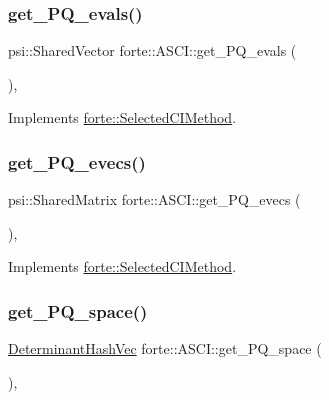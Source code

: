 \subsubsection{\texorpdfstring{get\+\_\+\+P\+Q\+\_\+evals()}{get\_PQ\_evals()}}
{\footnotesize\ttfamily psi\+::\+Shared\+Vector forte\+::\+A\+S\+C\+I\+::get\+\_\+\+P\+Q\+\_\+evals (\begin{DoxyParamCaption}{ }\end{DoxyParamCaption})\hspace{0.3cm}{\ttfamily [override]}, {\ttfamily [virtual]}}



Implements \mbox{\hyperlink{classforte_1_1_selected_c_i_method_a675d28ae66341b8cfabb2953c936621c}{forte\+::\+Selected\+C\+I\+Method}}.

\mbox{\label{classforte_1_1_a_s_c_i_a7b0cff30856eb70d451216e5039e15ee}} 
\subsubsection{\texorpdfstring{get\+\_\+\+P\+Q\+\_\+evecs()}{get\_PQ\_evecs()}}
{\footnotesize\ttfamily psi\+::\+Shared\+Matrix forte\+::\+A\+S\+C\+I\+::get\+\_\+\+P\+Q\+\_\+evecs (\begin{DoxyParamCaption}{ }\end{DoxyParamCaption})\hspace{0.3cm}{\ttfamily [override]}, {\ttfamily [virtual]}}



Implements \mbox{\hyperlink{classforte_1_1_selected_c_i_method_a5e5212836aa0dc35f98238d1f426abed}{forte\+::\+Selected\+C\+I\+Method}}.

\mbox{\label{classforte_1_1_a_s_c_i_abe4f88df4acd5e486cc1e9d43254bc0d}} 
\subsubsection{\texorpdfstring{get\+\_\+\+P\+Q\+\_\+space()}{get\_PQ\_space()}}
{\footnotesize\ttfamily \mbox{\hyperlink{classforte_1_1_determinant_hash_vec}{Determinant\+Hash\+Vec}} forte\+::\+A\+S\+C\+I\+::get\+\_\+\+P\+Q\+\_\+space (\begin{DoxyParamCaption}{ }\end{DoxyParamCaption})\hspace{0.3cm}{\ttfamily [override]}, {\ttfamily [virtual]}}



